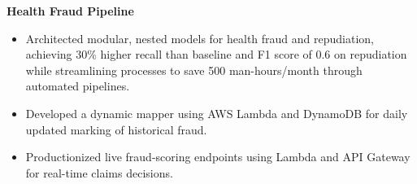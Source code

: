 \textbf{Health Fraud Pipeline}
\begin{itemize}
    \item Architected modular, nested models for health fraud and repudiation, achieving 30\% higher recall than baseline and F1 score of 0.6 on repudiation while streamlining processes to save 500 man-hours/month through automated pipelines.
    \item Developed a dynamic mapper using AWS Lambda and DynamoDB for daily updated marking of historical fraud.
    \item Productionized live fraud-scoring endpoints using Lambda and API Gateway for real-time claims decisions.
\end{itemize}
